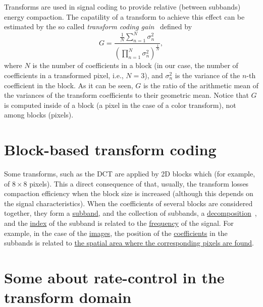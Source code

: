 Transforms are used in signal coding to provide relative (between
subbands) energy compaction. The capatility of a transform to achieve
this effect can be estimated by the so called \emph{transform coding
gain}~\cite{vetterli1995wavelets,sayood2017introduction} defined by
\begin{equation}
G = \frac{\frac{1}{N}\sum_{n=1}^N{\sigma_n^2}}{(\prod_{n=1}^N\sigma_n^2)^{\frac{1}{N}}},
\end{equation}
where $N$ is the number of coefficients in a block (in our case, the
number of coefficients in a transformed pixel, i.e., $N=3$), and
$\sigma_n^2$ is the variance of the $n$-th coefficient in the
block. As it can be seen, $G$ is the ratio of the arithmetic mean of
the variances of the transform coefficients to their geometric
mean. Notice that $G$ is computed inside of a block (a pixel in the
case of a color transform), not among blocks (pixels).


\section{Block-based transform coding}

Some transforms, such as the DCT are applied by 2D blocks which (for
example, of $8\times 8$ pixels). This a direct consequence of that,
usually, the transform losses compaction efficiency when the block size is
increased (although this depends on the signal characteristics). When
the coefficients of several blocks are considered together, they form
a \href{https://en.wikipedia.org/wiki/Sub-band_coding}{subband}, and
the collection of subbands, a
\href{https://en.wikipedia.org/wiki/Discrete_wavelet_transform}{decomposition}~\cite{vetterli2014foundations},
and the
\href{https://en.wikipedia.org/wiki/Array_data_structure#Element_identifier_and_addressing_formulas}{index}
of the subband is related to the
\href{https://en.wikipedia.org/wiki/Frequency}{frequency} of the
signal. For example, in the case of the
\href{https://en.wikipedia.org/wiki/Digital_image}{images}, the
position of the
\href{https://en.wikipedia.org/wiki/Coefficient}{coefficients} in the
subbands is related to
\href{https://github.com/Sistemas-Multimedia/Sistemas-Multimedia.github.io/blob/master/milestones/07-DCT/block_DCT_compression.ipynb}{the
  spatial area where the corresponding pixels are found}.


\section{Some about rate-control in the transform domain}

